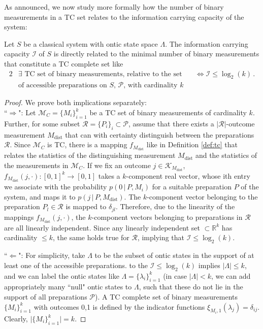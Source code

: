 As announced, we now study more formally how the number of binary measurements in a TC set relates to the information carrying capacity of the system:

\begin{lemma}
\label{lem:infcarcap}
Let $S$ be a classical system with ontic state space $\Lambda$. The information carrying capacity $\mathcal{I}$ of $S$ is directly related to the minimal number of binary measurements that constitute a TC complete set like
\begin{alignat*}{2}
& \exists \text{ TC set of binary measurements, relative to the set} && \iff \mathcal{I}\leq \log_2(k)\,.\\
& \text{of accessible preparations on $S$, $\mathcal{P}$, with cardinality $k$} && 
\end{alignat*}

\end{lemma}
\begin{proof}We prove both implications separately:\\[1em]
``$\Longrightarrow$": 
Let $\mathcal{M}_C=\{M_i\}_{i=1}^k$ be a TC set of binary measurements of cardinality $k$. Further, for some subset $\mathcal{R}=\{P_i\}_i\subset\mathcal{P}$, assume that there exists a $\vert\mathcal{R}\vert$-outcome measurement $M_{\text{dist}}$ that can with certainty distinguish between the preparations $\mathcal{R}$. Since $\mathcal{M}_C$ is TC, there is a mapping $f_{M_{\text{dist}}}$ like in Definition \ref{def:tc} that relates the statistics of the distinguishing measurement $M_{\text{dist}}$ and the statistics of the measurements in $\mathcal{M}_C$. If we fix an outcome $j\in\mathcal{K}_{M_{\text{dist}}}$, ${f_{M_{\text{dist}}}(j,\cdot):[0,1]^{k}\rightarrow[0,1]}$ takes a $k$-component real vector, whose ith entry we associate with the probability $p(0\,\vert\,P,M_i)$ for a suitable preparation $P$ of the system, and maps it to $p(j\,\vert\,P,M_{\text{dist}})$. The $k$-component vector belonging to the preparation $P_l\in\mathcal{R}$ is mapped to $\delta_{jl}$. Therefore, due to the linearity of the mappings $f_{M_{\text{dist}}}(j,\cdot)$, the $k$-component vectors belonging to preparations in $\mathcal{R}$ are all linearly independent. Since any linearly independent set $\subset \mathbb{R}^k$ has cardinality $\leq k$, the same holds true for $\mathcal{R}$, implying that $\mathcal{I}\leq\log_2(k)$.

``$\Longleftarrow$": For simplicity, take $\Lambda$ to be the subset of ontic states in the support of at least one of the accessible preparations. to the $\mathcal{I}\leq\log_2(k)$ implies $\vert\Lambda\vert\leq k$, and we can label the ontic states like $\Lambda=\{\lambda_i\}_{i=1}^k$ (in case $\vert\Lambda\vert<k$, we can add appropriately many ``null" ontic states to $\Lambda$, such that these do not lie in the support of all preparations $\mathcal{P}$). A TC complete set of binary measurements $\{M_i\}_{i=1}^k$ with outcomes 0,1 is defined by the indicator functions
$\xi_{M_i,1}(\lambda_j)=\delta_{ij}$. Clearly, $\vert \{M_i\}_{i=1}^k \vert=k$.
\end{proof}


